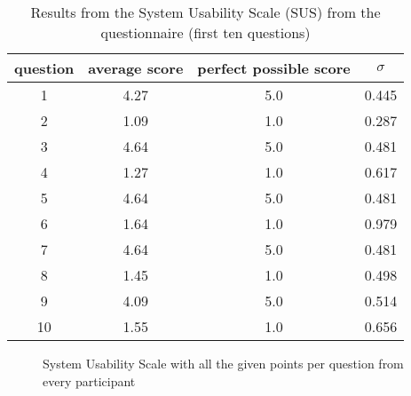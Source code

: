 \begin{table}[ht!]
    \centering
    \caption{Results from the System Usability Scale (SUS) from the questionnaire (first ten questions)}
    \begin{tabular}{cccc} \toprule
        question&average score&perfect possible score&$\sigma$\\ \midrule
        1 & 4.27 & 5.0 & 0.445\\ 
        2 & 1.09 & 1.0 & 0.287\\
        3 & 4.64 & 5.0 & 0.481\\ 
        4 & 1.27 & 1.0 & 0.617\\
        5 & 4.64 & 5.0 & 0.481\\
        6 & 1.64 & 1.0 & 0.979\\
        7 & 4.64 & 5.0 & 0.481\\
        8 & 1.45 & 1.0 & 0.498\\
        9 & 4.09 & 5.0 & 0.514\\
        10 & 1.55 & 1.0 & 0.656\\
        \bottomrule
    \end{tabular}
    \label{tab:table}
\end{table}
\fi
\begin{figure}[H]
    \noindent
    \vspace*{-10em}
    \caption{System Usability Scale with all the given points per question from every participant}
    \label{fig:SUS_score}
\end{figure}

